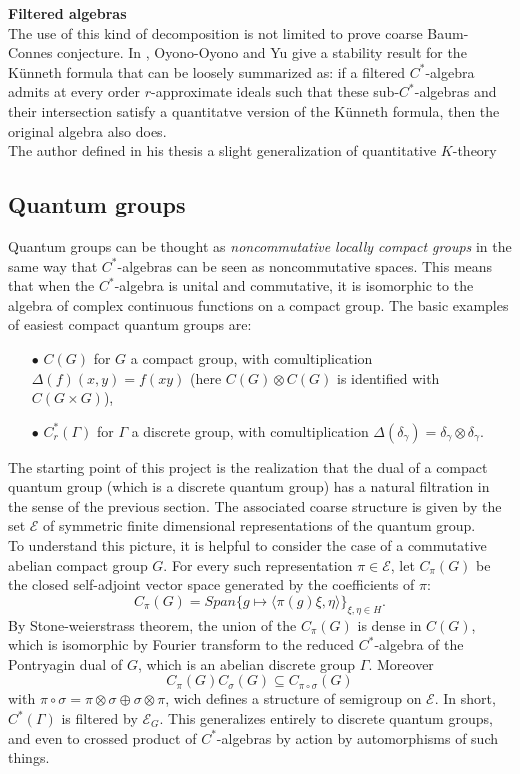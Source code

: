 \textbf{Filtered algebras}\\

The use of this kind of decomposition is not limited to prove coarse Baum-Connes conjecture. In \cite{OY3}, Oyono-Oyono and Yu give a stability result for the K\"unneth formula that can be loosely summarized as: if a filtered $C^*$-algebra admits at every order $r$-approximate ideals such that these sub-$C^*$-algebras and their intersection satisfy a quantitatve version of the K\"unneth formula, then the original algebra also does.\\
  
The author defined in his thesis a slight generalization of quantitative $K$-theory


\subsection{Quantum groups}

Quantum groups can be thought as \textit{noncommutative locally compact groups} in the same way that $C^*$-algebras can be seen as noncommutative spaces. This means that when the $C^*$-algebra is unital and commutative, it is isomorphic to the algebra of complex continuous functions on a compact group. The basic examples of easiest compact quantum groups are:
\begin{itemize}
\item[$\bullet$] $C(G)$ for $G$ a compact group, with comultiplication $\Delta(f)(x,y)= f(xy)$ (here $C(G)\otimes C(G)$ is identified with $C(G\times G)$),
\item[$\bullet$] $C^*_r(\Gamma)$ for $\Gamma$ a discrete group, with comultiplication $\Delta(\delta_\gamma)= \delta_\gamma \otimes \delta_\gamma$.\\
\end{itemize}     
The starting point of this project is the realization that the dual of a compact quantum group (which is a discrete quantum group) has a natural filtration in the sense of the previous section. The associated coarse structure is given by the set $\mathcal E$ of symmetric finite dimensional representations of the quantum group. \\

To understand this picture, it is helpful to consider the case of a commutative abelian compact group $G$. For every such representation $\pi\in \mathcal E$, let $C_\pi(G)$ be the closed self-adjoint vector space generated by the coefficients of $\pi$:
\[C_\pi(G)  = Span \{ g \mapsto \langle \pi(g)\xi, \eta\rangle\}_{\xi,\eta\in H}.\]
By Stone-weierstrass theorem, the union of the $C_\pi(G)$ is dense in $C(G)$, which is isomorphic by Fourier transform to the reduced $C^*$-algebra of the Pontryagin dual of $G$, which is an abelian discrete group $\Gamma$. Moreover
\[C_\pi(G)C_\sigma(G) \subseteq C_{\pi \circ\sigma}(G)\]
with $\pi \circ\sigma = \pi \otimes\sigma \oplus \sigma \otimes \pi$, wich defines a structure of semigroup on $\mathcal E$. In short, $C^*(\Gamma)$ is filtered by 
$\mathcal E_G$. This generalizes entirely to discrete quantum groups, and even to crossed product of $C^*$-algebras by action by automorphisms of such things. \\

